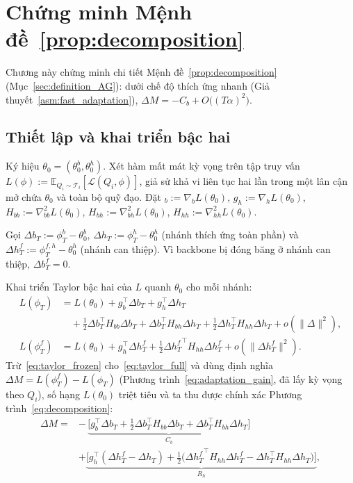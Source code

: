 \appendix

\chapter{Chứng minh Mệnh đề~\ref{prop:decomposition}}
\label{appendix:taylor_proof}

Chương này chứng minh chi tiết Mệnh đề~\ref{prop:decomposition} (Mục~\ref{sec:definition_AG}): dưới chế độ thích ứng nhanh (Giả thuyết~\ref{asm:fast_adaptation}), $\Delta M = -C_b + O\big((T\alpha)^2\big)$.

\section{Thiết lập và khai triển bậc hai}

Ký hiệu $\theta_0 = (\theta_0^b, \theta_0^h)$. Xét hàm mất mát kỳ vọng trên tập truy vấn $L(\phi) := \mathbb{E}_{Q_i\sim\mathcal{T}_i}[\mathcal{L}(Q_i,\phi)]$, giả sử khả vi liên tục hai lần trong một lân cận mở chứa $\theta_0$ và toàn bộ quỹ đạo. Đặt $_b := \nabla_b L(\theta_0)$, $g_h := \nabla_h L(\theta_0)$, $H_{bb} := \nabla^2_{bb} L(\theta_0)$, $H_{bh} := \nabla^2_{bh} L(\theta_0)$, $H_{hh} := \nabla^2_{hh} L(\theta_0)$.

Gọi $\Delta b_T := \phi_T^b - \theta_0^b$, $\Delta h_T := \phi_T^h - \theta_0^h$ (nhánh thích ứng toàn phần) và $\Delta h_T^f := \phi_T^{f,h} - \theta_0^h$ (nhánh can thiệp). Vì backbone bị đóng băng ở nhánh can thiệp, $\Delta b_T^f = 0$.

Khai triển Taylor bậc hai của $L$ quanh $\theta_0$ cho mỗi nhánh:
\begin{align}
    L(\phi_T) &= L(\theta_0) + g_b^\top \Delta b_T + g_h^\top \Delta h_T \nonumber\\
    &\quad + \tfrac{1}{2}\Delta b_T^\top H_{bb} \Delta b_T + \Delta b_T^\top H_{bh} \Delta h_T + \tfrac{1}{2}\Delta h_T^\top H_{hh} \Delta h_T + o(\|\Delta\|^2), \label{eq:taylor_full}\\[4pt]
    L(\phi_T^f) &= L(\theta_0) + g_h^\top \Delta h_T^f + \tfrac{1}{2}{\Delta h_T^f}^\top H_{hh} \Delta h_T^f + o(\|\Delta h_T^f\|^2). \label{eq:taylor_frozen}
\end{align}
Trừ~\eqref{eq:taylor_frozen} cho~\eqref{eq:taylor_full} và dùng định nghĩa $\Delta M = L(\phi_T^f) - L(\phi_T)$ (Phương trình~\eqref{eq:adaptation_gain}, đã lấy kỳ vọng theo $Q_i$), số hạng $L(\theta_0)$ triệt tiêu và ta thu được chính xác Phương trình~\eqref{eq:decomposition}:
\begin{equation}
    \begin{split}
        \Delta M = & -\,\underbrace{\Big[g_b^\top \Delta b_T + \tfrac{1}{2}\Delta b_T^\top H_{bb} \Delta b_T + \Delta b_T^\top H_{bh} \Delta h_T\Big]}_{C_b} \\
    &+ \underbrace{\Big[g_h^\top(\Delta h_T^f - \Delta h_T) + \tfrac{1}{2}\big({\Delta h_T^f}^\top H_{hh} \Delta h_T^f - \Delta h_T^\top H_{hh} \Delta h_T\big)\Big]}_{R_h},
    \end{split}
    \label{eq:decomposition}
\end{equation}

